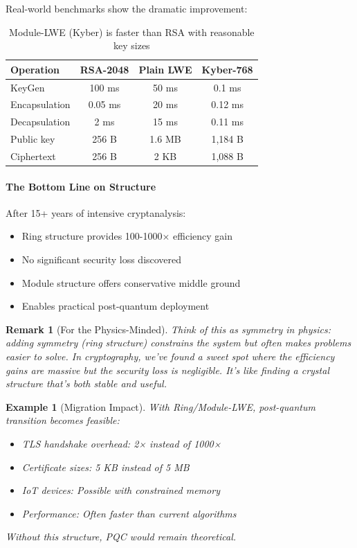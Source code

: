 \documentclass[11pt,a4paper]{article}
\newtheorem{example}{Example}
\newtheorem{remark}{Remark}
\begin{document}
Real-world benchmarks show the dramatic improvement:

\begin{table}[h]
\centering
\begin{tabular}{|l|c|c|c|}
\hline
\textbf{Operation} & \textbf{RSA-2048} & \textbf{Plain LWE} & \textbf{Kyber-768} \\
\hline
KeyGen & 100 ms & 50 ms & 0.1 ms \\
Encapsulation & 0.05 ms & 20 ms & 0.12 ms \\
Decapsulation & 2 ms & 15 ms & 0.11 ms \\
Public key & 256 B & 1.6 MB & 1,184 B \\
Ciphertext & 256 B & 2 KB & 1,088 B \\
\hline
\end{tabular}
\caption{Module-LWE (Kyber) is faster than RSA with reasonable key sizes}
\end{table}

\paragraph{The Bottom Line on Structure}

After 15+ years of intensive cryptanalysis:
\begin{itemize}
    \item Ring structure provides 100-1000× efficiency gain
    \item No significant security loss discovered
    \item Module structure offers conservative middle ground
    \item Enables practical post-quantum deployment
\end{itemize}

\begin{remark}[For the Physics-Minded]
Think of this as symmetry in physics: adding symmetry (ring structure) constrains the system but often makes problems easier to solve. In cryptography, we've found a sweet spot where the efficiency gains are massive but the security loss is negligible. It's like finding a crystal structure that's both stable and useful.
\end{remark}

\begin{example}[Migration Impact]
With Ring/Module-LWE, post-quantum transition becomes feasible:
\begin{itemize}
    \item TLS handshake overhead: 2× instead of 1000×
    \item Certificate sizes: 5 KB instead of 5 MB
    \item IoT devices: Possible with constrained memory
    \item Performance: Often faster than current algorithms
\end{itemize}
Without this structure, PQC would remain theoretical.
\end{example}
\end{document}
